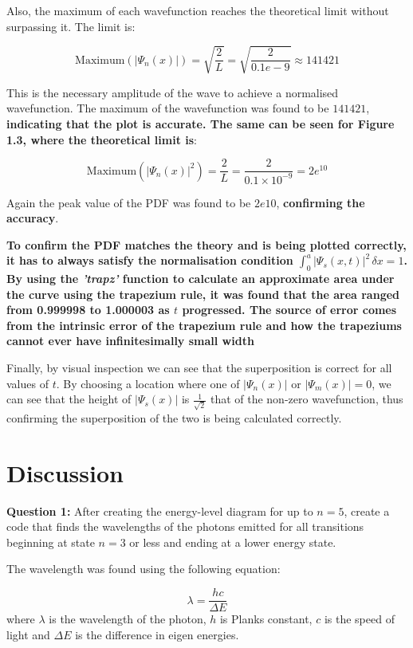 Also, the maximum of each wavefunction reaches the theoretical limit without surpassing it. The limit is:

$$ \text{Maximum}(|\Psi_n(x)|) = \sqrt{\frac{2}{L}} = \sqrt{\frac{2}{0.1e-9}} \approx  141421 $$

This is the necessary amplitude of the wave to achieve a normalised wavefunction.
The maximum of the wavefunction was found to be $141421$, \textbf{indicating that the plot is accurate. The same can be seen for Figure 1.3, where the theoretical limit is}:

$$ \text{Maximum}(|\Psi_n(x)|^{2}) = \frac{2}{L} = \frac{2}{0.1 \times 10^{-9}} = 2e^{10} $$

Again the peak value of the PDF was found to be $2e10$, \textbf{confirming the accuracy}.

\textbf{To confirm the PDF matches the theory and is being plotted correctly, it has to always satisfy the normalisation condition $\int_{0}^{a} |\Psi_s(x,t)|^{2} \,\delta x = 1$. By using the \textit{'trapz'} function to calculate an approximate area under the curve using the trapezium rule, it was found that the area ranged from 0.999998 to 1.000003 as $t$ progressed. The source of error comes from the intrinsic error of the trapezium rule and how the trapeziums cannot ever have infinitesimally small width}

Finally, by visual inspection we can see that the superposition is correct for all values of $t$. By choosing a location where one of $|\Psi_n(x)|$ or $|\Psi_m(x)| = 0$, we can see that the height of $|\Psi_s(x)|$ is $\frac{1}{\sqrt{2}}$ that of the non-zero wavefunction, thus confirming the superposition of the two is being calculated correctly. 

\section{Discussion}
\textbf{Question 1:}
After creating the energy-level diagram for up to $n=5$, create a code that finds the wavelengths of the photons emitted for all transitions beginning at state $n=3$ or less and ending at a lower energy state.

The wavelength was found using the following equation:

\[\lambda = \frac{hc}{\Delta E}\]
where $\lambda$ is the wavelength of the photon, $h$ is Planks constant, $c$ is the speed of light and $\Delta E$ is the difference in eigen energies.

